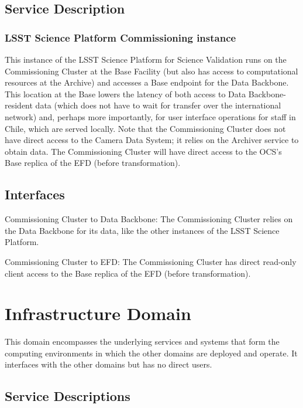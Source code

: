 \documentclass[DM,toc]{lsstdoc}
\begin{document}
\subsection{Service Description}\label{commcluster-service}

\subsubsection{LSST Science Platform Commissioning
instance}\label{lsst-science-platform-commissioning-instance}

This instance of the LSST Science Platform for Science Validation runs
on the Commissioning Cluster at the Base Facility (but also has access
to computational resources at the Archive) and accesses a Base endpoint
for the Data Backbone. This location at the Base lowers the latency of
both access to Data Backbone-resident data (which does not have to wait
for transfer over the international network) and, perhaps more
importantly, for user interface operations for staff in Chile, which are
served locally. Note that the Commissioning Cluster does not have direct
access to the Camera Data System; it relies on the Archiver service to
obtain data. The Commissioning Cluster will have direct access to the
OCS's Base replica of the EFD (before transformation).

\subsection{Interfaces}\label{commcluster-interfaces}

Commissioning Cluster to Data Backbone: The Commissioning Cluster relies on the
Data Backbone for its data, like the other instances of the LSST Science
Platform.

Commissioning Cluster to EFD: The Commissioning Cluster has direct read-only
client access to the Base replica of the EFD (before transformation).


\section{Infrastructure Domain}\label{infrastructure-domain}

This domain encompasses the underlying services and systems that form
the computing environments in which the other domains are deployed and
operate. It interfaces with the other domains but has no direct users.

\subsection{Service Descriptions}\label{infrastructure-service-descriptions}
\end{document}
